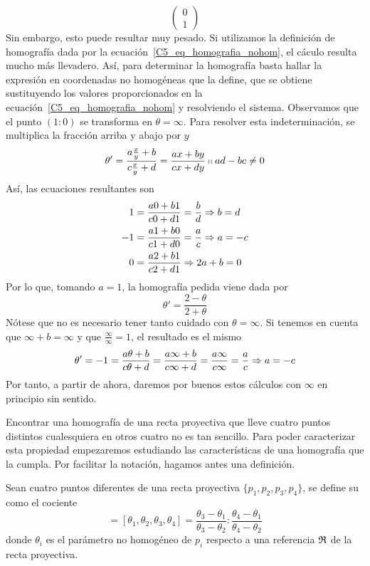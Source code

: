 \begin{exa}
\begin{equation*}
		\left( \begin{array}{c}
			0\\ 1
		\end{array}\right)
	\end{equation*}
	Sin embargo, esto puede resultar muy pesado. Si utilizamos la definición de homografía dada por la ecuación~\eqref{C5_eq_homografia_nohom}, el cáculo resulta mucho más llevadero. Así, para determinar la homografía basta hallar la expresión en coordenadas no homogéneas que la define, que se obtiene sustituyendo los valores proporcionados en la ecuación~\eqref{C5_eq_homografia_nohom} y resolviendo el sistema. Observamos que el punto $(1:0)$ se transforma en $\theta=\infty$. Para resolver esta indeterminación, se multiplica la fracción arriba y abajo por $y$
	\begin{equation}
		\theta'=\frac{a\frac{x}{y}+b}{c\frac{x}{y}+d}=\frac{ax+by}{cx +dy}\shortparallel ad-bc\not=0
	\end{equation}
	Así, las ecuaciones resultantes son
	\begin{equation*}
		\begin{split}
			1&=\frac{a0+b1}{c0 +d1}=\frac{b}{d}\Rightarrow b=d\\
			-1&=\frac{a1+b0}{c1 +d0}=\frac{a}{c}\Rightarrow a=-c\\
			0&=\frac{a2+b1}{c2 +d1}\Rightarrow 2a+b=0
		\end{split}
	\end{equation*}
	Por lo que, tomando $a=1$, la homografía pedida viene dada por
	\begin{equation*}
		\theta'=\frac{2-\theta}{2+\theta}
	\end{equation*}
	Nótese que no es necesario tener tanto cuidado con $\theta=\infty$. Si tenemos en cuenta que $\infty+b=\infty$ y que $\frac{\infty}{\infty}=1$, el resultado es el mismo
	\begin{equation*}
		\theta'=-1=\frac{a\theta+b}{c\theta +d}=\frac{a\infty+b}{c\infty +d}=\frac{a\infty}{c\infty}=\frac{a}{c}\Rightarrow a=-c
	\end{equation*}
	Por tanto, a partir de ahora, daremos por buenos estos cálculos con $\infty$ en principio sin sentido.
\end{exa}
Encontrar una homografía de una recta proyectiva que lleve cuatro puntos distintos cualesquiera en otros cuatro no es tan sencillo. Para poder caracterizar esta propiedad empezaremos estudiando las características de una homografía que la cumpla. Por facilitar la notación, hagamos antes una definición.
\begin{defi}
	Sean cuatro puntos diferentes de una recta proyectiva $\{p_1,p_2,p_3,p_4\}$, se define su  como el cociente
	\begin{equation}
		[p_1,p_2,p_3,p_4]=[\theta_1,\theta_2,\theta_3,\theta_4]=\frac{\theta_3-\theta_1}{\theta_3-\theta_2}:\frac{\theta_4-\theta_1}{\theta_4-\theta_2}
	\end{equation}
	donde $\theta_i$ es el parámetro no homogéneo de $p_i$ respecto a una referencia $\mathfrak{R}$ de la recta proyectiva.
\end{defi}

